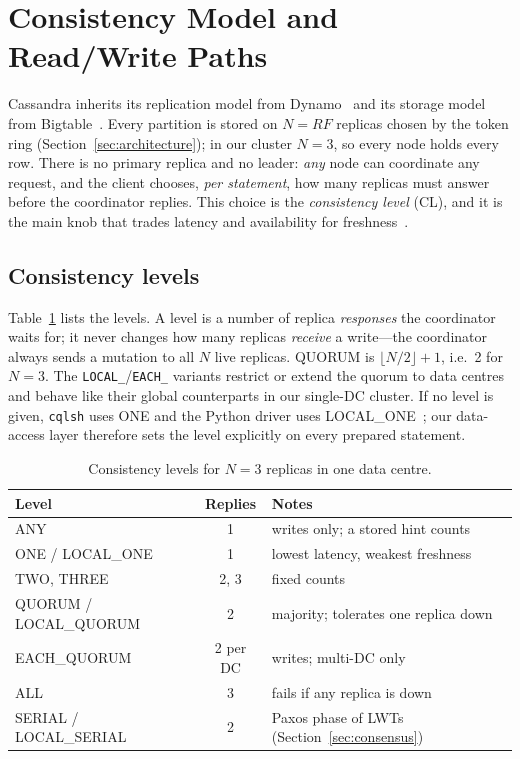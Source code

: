 \section{Consistency Model and Read/Write Paths}\label{sec:consistency}

Cassandra inherits its replication model from Dynamo~\cite{decandia2007dynamo} and its
storage model from Bigtable~\cite{lakshman2010cassandra}. Every partition is stored on
$N = \mathit{RF}$ replicas chosen by the token ring (Section~\ref{sec:architecture}); in our
cluster $N = 3$, so every node holds every row. There is no primary replica and no leader:
\emph{any} node can coordinate any request, and the client chooses, \emph{per statement}, how
many replicas must answer before the coordinator replies. This choice is the
\emph{consistency level} (CL), and it is the main knob that trades latency and availability
for freshness~\cite{cassdoc-dynamo,abadi2012pacelc}.

\subsection{Consistency levels}

Table~\ref{tab:cl} lists the levels. A level is a number of replica \emph{responses} the
coordinator waits for; it never changes how many replicas \emph{receive} a write---the
coordinator always sends a mutation to all $N$ live replicas. QUORUM is
$\lfloor N/2 \rfloor + 1$, i.e.\ 2 for $N = 3$. The \texttt{LOCAL\_}/\texttt{EACH\_} variants
restrict or extend the quorum to data centres and behave like their global counterparts in
our single-DC cluster. If no level is given, \texttt{cqlsh} uses ONE and the Python driver
uses LOCAL\_ONE~\cite{pydriver}; our data-access layer therefore sets the level explicitly
on every prepared statement.

\begin{table}[t]\centering\footnotesize
\caption{Consistency levels for $N = 3$ replicas in one data centre.}\label{tab:cl}
\begin{tabular}{lcl}\hline
Level & Replies & Notes \\ \hline
ANY & 1 & writes only; a stored hint counts \\
ONE / LOCAL\_ONE & 1 & lowest latency, weakest freshness \\
TWO, THREE & 2, 3 & fixed counts \\
QUORUM / LOCAL\_QUORUM & 2 & majority; tolerates one replica down \\
EACH\_QUORUM & 2 per DC & writes; multi-DC only \\
ALL & 3 & fails if any replica is down \\
SERIAL / LOCAL\_SERIAL & 2 & Paxos phase of LWTs (Section~\ref{sec:consensus}) \\ \hline
\end{tabular}
\end{table}

